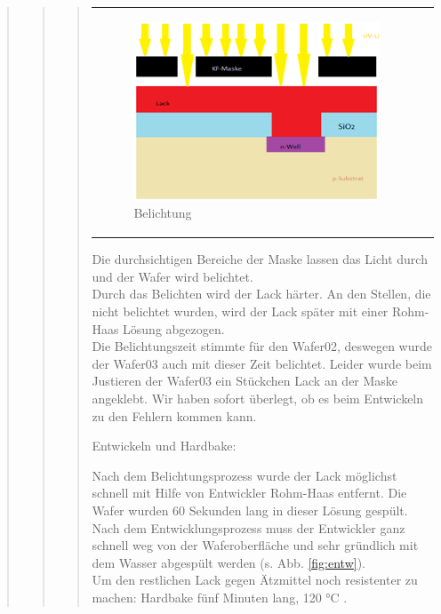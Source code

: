 \begin{quote}
\begin{quote}
\begin{quote}
\begin{center}
\begin{tabular}{ll}
\begin{minipage}{0.6\textwidth}
                        \begin{figure}[H]
                        \hspace{-1em}
                            \includegraphics[scale=0.9, trim = 0cm 0cm 0cm
                            0cm, clip]
                            {./HerstellungBilder/DerMomentderBelichtung.png}
                            \caption{Belichtung}
                           \label{fig:belichtung2}
                        \end{figure}
                    \vspace{-1.5em}

                    \end{minipage}

                \end{tabular}
			\end{center}
    
    		\vspace{2em}
    		
    		Die durchsichtigen Bereiche der Maske lassen das Licht durch und der 
    		Wafer wird belichtet.\\
			Durch das Belichten wird der Lack härter. An den Stellen, die nicht
			belichtet wurden, wird der Lack später mit einer Rohm-Haas Lösung 
			abgezogen.\\
			Die Belichtungszeit stimmte für den Wafer02, deswegen wurde der
			Wafer03 auch mit dieser Zeit belichtet. Leider wurde beim Justieren 
			der Wafer03 ein Stückchen Lack an der Maske angeklebt. Wir haben sofort überlegt, ob es beim Entwickeln zu den Fehlern kommen kann.

			Entwickeln und Hardbake: 

			Nach dem Belichtungsprozess wurde der Lack möglichst schnell mit 
			Hilfe von Entwickler Rohm-Haas entfernt. Die Wafer wurden 60 
			Sekunden lang in dieser Lösung gespült.\\
			Nach dem Entwicklungsprozess muss der Entwickler ganz schnell weg 
			von der Waferoberfläche und sehr gründlich mit dem Wasser abgespült 
			werden (s. Abb. \ref{fig:entw}).\\
			Um den restlichen Lack gegen Ätzmittel noch resistenter zu machen:
			Hardbake fünf Minuten lang, 120 °C .
			

\end{quote}
\end{quote}
\end{quote}
